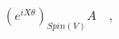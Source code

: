 \begin{equation}
\left( e^{iX\theta } \right)_{Spin(V)} A \quad ,
\label{eq:spinrot}
\end{equation}

